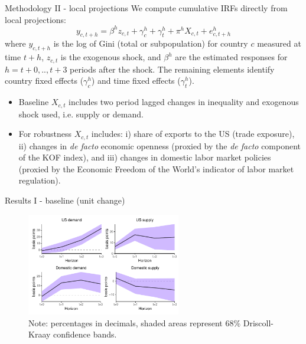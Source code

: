 \documentclass[10pt,leqno,aspectratio=169,presentation]{beamer} %
\begin{document}
\begin{frame}{Methodology II - local projections}
We compute cumulative IRFs directly from local projections:
\begin{equation}
    y_{c,t+h} =  \beta^h z_{c,t} + \gamma^h_c + \gamma^h_t + \pi^h X_{c,t} + e^h_{c, t+h}
\label{eq:1}
\end{equation}
\noindent where $y_{c,t+h}$ is the log of Gini (total or subpopulation) for country $c$ measured at time $t+h$, $z_{c,t}$ is the exogenous shock, and $\beta^h$ are the estimated responses for $h = t+0,..,t+3$ periods after the shock. The remaining elements identify country fixed effects ($\gamma^h_c$) and time fixed effects ($\gamma^h_t$). 

\begin{itemize}
    \item Baseline $X_{c,t}$ includes two period lagged changes in inequality and exogenous shock used, i.e. supply or demand.
    \item For robustness $X_{c,t}$ includes: i) share of exports to the US (trade exposure), ii) changes in \textit{de facto} economic openness (proxied by the \textit{de facto} component of the KOF index), and iii) changes in domestic labor market policies (proxied by the Economic Freedom of the World's indicator of labor market regulation).
\end{itemize}
\end{frame}

\begin{frame}{Results I - baseline (unit change)}
\begin{figure}[H]
    \centering    
    \caption{Cumulative impulse responses to demand and supply shocks: Gini (total), baseline.}    
    \label{fig:demand_supply_base}
    \includegraphics[width=0.60\textwidth]{Figures/baseline_demand_supply_LP_extended.pdf}
    \centering \caption*{Note: percentages in decimals, shaded areas represent 68\% Driscoll-Kraay confidence bands.}
\end{figure}
\end{frame}
\end{document}

